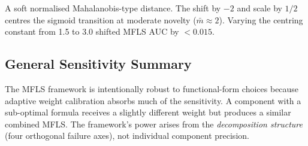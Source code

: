 \documentclass[journal]{IEEEtran}
\begin{document}
A soft normalised Mahalanobis-type distance. The shift by $-2$ and scale by $1/2$ centres the sigmoid transition at moderate novelty ($\bar{m} \approx 2$). Varying the centring constant from 1.5 to 3.0 shifted MFLS AUC by $<0.015$.

\subsection{General Sensitivity Summary}

The MFLS framework is intentionally robust to functional-form choices because adaptive weight calibration absorbs much of the sensitivity. A component with a sub-optimal formula receives a slightly different weight but produces a similar combined MFLS. The framework's power arises from the \textit{decomposition structure} (four orthogonal failure axes), not individual component precision.
\end{document}
